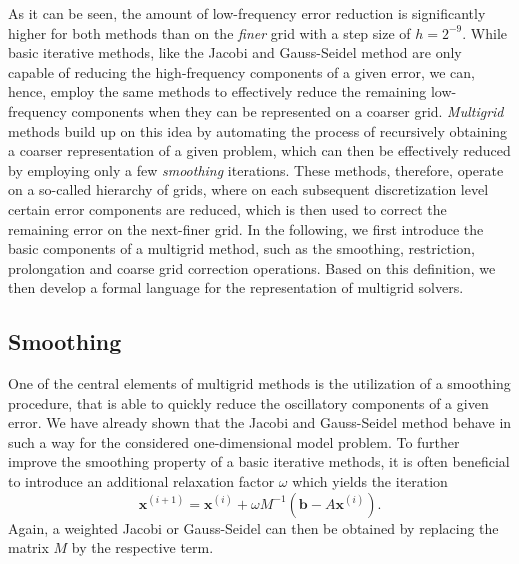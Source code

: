 As it can be seen, the amount of low-frequency error reduction is significantly higher for both methods than on the \emph{finer} grid with a step size of $h = 2^{-9}$.
While basic iterative methods, like the Jacobi and Gauss-Seidel method are only capable of reducing the high-frequency components of a given error, we can, hence, employ the same methods to effectively reduce the remaining low-frequency components when they can be represented on a coarser grid.
\emph{Multigrid} methods build up on this idea by automating the process of recursively obtaining a coarser representation of a given problem, which can then be effectively reduced by employing only a few \emph{smoothing} iterations.
These methods, therefore, operate on a so-called hierarchy of grids, where on each subsequent discretization level certain error components are reduced, which is then used to correct the remaining error on the next-finer grid.
In the following, we first introduce the basic components of a multigrid method, such as the smoothing, restriction, prolongation and coarse grid correction operations.
Based on this definition, we then develop a formal language for the representation of multigrid solvers.
\subsection{Smoothing}
\label{subsec:smoothing}
One of the central elements of multigrid methods is the utilization of a smoothing procedure, that is able to quickly reduce the oscillatory components of a given error.
We have already shown that the Jacobi and Gauss-Seidel method behave in such a way for the considered one-dimensional model problem.
To further improve the smoothing property of a basic iterative methods, it is often beneficial to introduce an additional relaxation factor $\omega$ which yields the iteration 
\begin{equation}
	\bm{x}^{(i+1)} = \bm{x}^{(i)} + \omega M^{-1}(\bm b - A \bm{x}^{(i)}).
	\label{eq:general-weighted-stationary-iterative-method}
\end{equation}
Again, a weighted Jacobi or Gauss-Seidel can then be obtained by replacing the matrix $M$ by the respective term.
